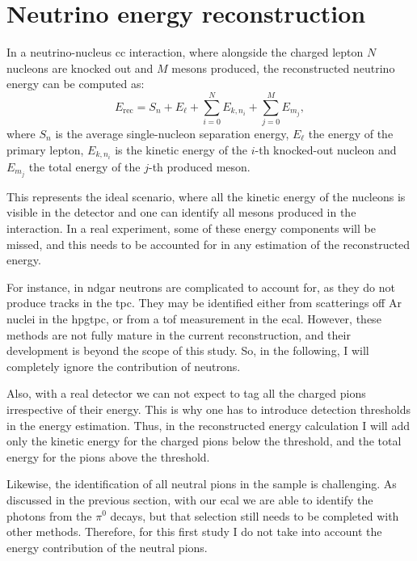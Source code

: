 \section{Neutrino energy reconstruction}
\label{sec:gar_energy}

In a neutrino-nucleus \gls{cc} interaction, where alongside the charged lepton $N$ nucleons are knocked out and $M$ mesons produced, the reconstructed neutrino energy can be computed as:
\begin{equation}
    E_{\mathrm{rec}} = S_{n} + E_{\ell} + \sum_{i=0}^{N} E_{k,n_{i}} + \sum_{j=0}^{M} E_{m_{j}},
\end{equation}
where $S_{n}$ is the average single-nucleon separation energy, $E_{\ell}$ the energy of the primary lepton, $E_{k,n_{i}}$ is the kinetic energy of the $i$-th knocked-out nucleon and $E_{m_{j}}$ the total energy of the $j$-th produced meson.

This represents the ideal scenario, where all the kinetic energy of the nucleons is visible in the detector and one can identify all mesons produced in the interaction. In a real experiment, some of these energy components will be missed, and this needs to be accounted for in any estimation of the reconstructed energy.

For instance, in \gls{ndgar} neutrons are complicated to account for, as they do not produce tracks in the \gls{tpc}. They may be identified either from scatterings off Ar nuclei in the \gls{hpgtpc}, or from a \gls{tof} measurement in the \gls{ecal}. However, these methods are not fully mature in the current reconstruction, and their development is beyond the scope of this study. So, in the following, I will completely ignore the contribution of neutrons.

Also, with a real detector we can not expect to tag all the charged pions irrespective of their energy. This is why one has to introduce detection thresholds in the energy estimation. Thus, in the reconstructed energy calculation I will add only the kinetic energy for the charged pions below the threshold, and the total energy for the  pions above the threshold.

Likewise, the identification of all neutral pions in the sample is challenging. As discussed in the previous section, with our \gls{ecal} we are able to identify the photons from the $\pi^{0}$ decays, but that selection still needs to be completed with other methods. Therefore, for this first study I do not take into account the energy contribution of the neutral pions.

